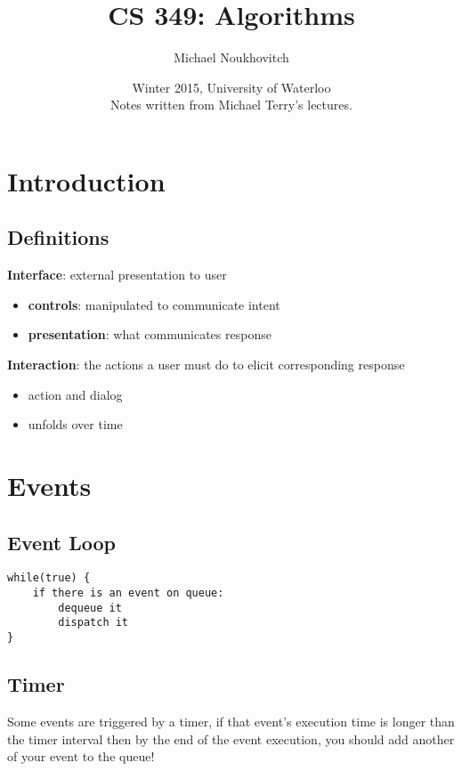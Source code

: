 \documentclass[]{article}
\theoremstyle{definition}
\begin{document}
	\let\ref\Cref

	\title{\bf{CS 349: Algorithms}}
	\date{Winter 2015, University of Waterloo \\ \center Notes written from Michael Terry's lectures.}
	\author{Michael Noukhovitch}

	\maketitle
	\newpage
	\tableofcontents
	\newpage

	\section{Introduction}
		\subsection{Definitions}
			\textbf{Interface}: external presentation to user
			\begin{itemize}
				\item \textbf{controls}: manipulated to communicate intent
				\item \textbf{presentation}: what communicates response
			\end{itemize}
			\textbf{Interaction}: the actions a user must do to elicit corresponding response
			\begin{itemize}
				\item action and dialog
				\item unfolds over time
			\end{itemize}
	\section{Events}
		\subsection{Event Loop}
			\begin{lstlisting}
while(true) {
	if there is an event on queue:
		dequeue it 
		dispatch it
}
			\end{lstlisting}
		\subsection{Timer}
			Some events are triggered by a timer, if that event's execution time is longer than the timer interval 
			then by the end of the event execution, you should add another of your event to the queue!
\end{document}
